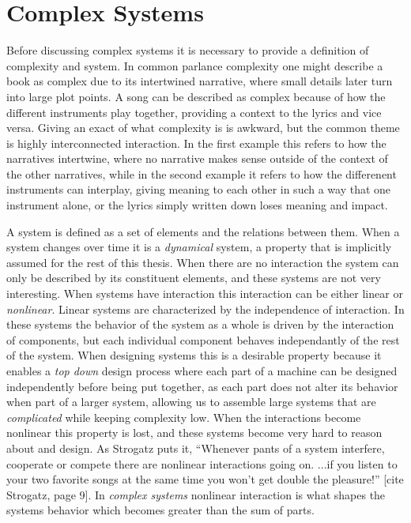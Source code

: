 \section{Complex Systems}
%
Before discussing complex systems it is necessary to provide a definition of
complexity and system.
In common parlance complexity one might describe a book as complex due to its
intertwined narrative, where small details later turn into large plot points.
A song can be described as complex because of how the different instruments play
together, providing a context to the lyrics and vice versa.
Giving an exact of what complexity is is awkward, but the common theme is
highly interconnected interaction.
In the first example this refers to how the narratives intertwine, where no
narrative makes sense outside of the context of the other narratives, while in
the second example it refers to how the differenent instruments can interplay,
giving meaning to each other in such a way that one instrument alone, or the
lyrics simply written down loses meaning and impact.
\par
%
A system is defined as a set of elements and the relations between them.
When a system changes over time it is a \emph{dynamical} system, a property that
is implicitly assumed for the rest of this thesis.
When there are no interaction the system can only be described by its
constituent elements, and these systems are not very interesting.
When systems have interaction this interaction can be either linear or
\emph{nonlinear}.
Linear systems are characterized by the independence of interaction.
In these systems the behavior of the system as a whole is driven by the
interaction of components, but each individual component behaves independantly
of the rest of the system.
When designing systems this is a desirable property because it enables a
\emph{top down} design process where each part of a machine can be designed
independently before being put together, as each part does not alter its
behavior when part of a larger system, allowing us to assemble large systems
that are \emph{complicated} while keeping complexity low.
When the interactions become nonlinear this property is lost, and these systems
become very hard to reason about and design.
As Strogatz puts it, ``Whenever pants of a system interfere, cooperate or
compete there are nonlinear interactions going on. ...if you listen to your two
favorite songs at the same time you won't get double the pleasure!'' [cite
Strogatz, page 9].
In \emph{complex systems} nonlinear interaction is what shapes the systems
behavior which becomes greater than the sum of parts.
%
